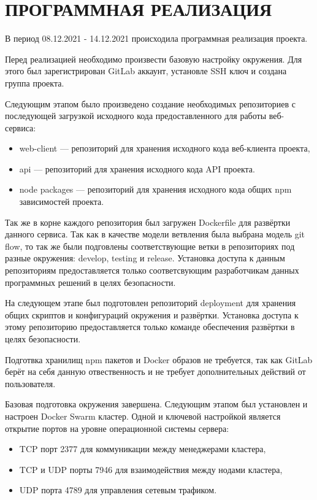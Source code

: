 \section{ПРОГРАММНАЯ РЕАЛИЗАЦИЯ}

В период 08.12.2021 - 14.12.2021 происходила программная реализация проекта.

Перед реализацией необходимо произвести базовую настройку окружения.
Для этого был зарегистрирован GitLab аккаунт, установле SSH ключ и создана группа проекта.

Следующим этапом было произведено создание необходимых репозиториев с последующей загрузкой исходного кода предоставленного для работы веб-сервиса:

\begin{itemize}
    \item web-client --- репозиторий для хранения исходного кода веб-клиента проекта,
    \item api --- репозиторий для хранения исходного кода API проекта.
    \item node packages --- репозиторий для хранения исходного кода общих npm зависимостей проекта.
\end{itemize}

Так же в корне каждого репозитория был загружен Dockerfile для развёртки данного сервиса.
Так как в качестве модели ветвления была выбрана модель git flow, то так же были подговлены соответствующие ветки в репозиториях под разные окружения: develop, testing и release.
Установка доступа к данным репозиториям предоставляется только соответсвующим разработчикам данных программных решений в целях безопасности.

На следующем этапе был подготовлен репозиторий deployment для хранения общих скриптов и конфигураций окружения и развёртки.
Установка доступа к этому репозиторию предоставляется только команде обеспечения развёртки в целях безопасности.

Подготвка хранилищ npm пакетов и Docker образов не требуется, так как GitLab берёт на себя данную отвественность и не требует дополнительных действий от пользователя.

Базовая подготовка окружения завершена.
Следующим этапом был установлен и настроен Docker Swarm кластер.
Одной и ключевой настройкой является открытие портов на уровне операционной системы сервера:

\begin{itemize}
    \item TCP порт 2377 для коммуникации между менеджерами кластера,
    \item TCP и UDP порты 7946 для взаимодействия между нодами кластера,
    \item UDP порта 4789 для управления сетевым трафиком.
\end{itemize}

